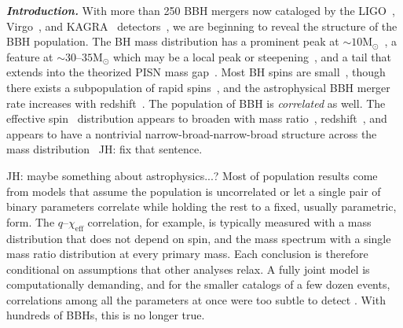 \documentclass[%
 reprint,
 amsmath,amssymb,
 aps,
 prl,
 nofootinbib,nobibnotes,
]{revtex4-2}
\newcommand{\Msun}{\ensuremath{\mathrm{M}_{\odot}}}
\newcommand{\chieff}{\ensuremath{\chi_{\mathrm{eff}}}}
\newcommand{\jh}[1]{{\color{orange}JH: #1}}
\newcommand{\heading}[1]{\textbf{\textit{#1}}}
\begin{document}
\heading{Introduction.}
With more than 250 \ac{BBH} mergers now cataloged by the LIGO~\cite{LIGOScientific:2014pky}, Virgo~\cite{VIRGO:2014yos}, and KAGRA~\cite{KAGRA:2020tym} detectors~\cite{LIGOScientific:2018mvr, LIGOScientific:2020ibl, LIGOScientific:2021usb, KAGRA:2021vkt, LIGOScientific:2025slb, LIGOScientific:2026wfs}, we are beginning to reveal the structure of the \ac{BBH} population. The \ac{BH} mass distribution has a prominent peak at $\sim 10\Msun$~\cite{LIGOScientific:2020kqk, Tiwari:2020otp, Edelman:2021zkw, KAGRA:2021duu, Callister:2023tgi, LIGOScientific:2025pvj, LIGOScientific:2026ctl}, a feature at $\sim 30$--$35 \Msun$ which may be a local peak or steepening~\cite{Talbot:2018cva, LIGOScientific:2020kqk, KAGRA:2021duu, Farah:2023vsc, LIGOScientific:2025pvj, LIGOScientific:2026ctl}, and a tail that extends into the theorized \ac{PISN} mass gap~\cite{Barkat:1967zz, Woosley:2016hmi, Tong:2025wpz, Antonini:2025ilj, Ray:2025xti}. Most \ac{BH} spins are small~\cite{Miller:2020zox, Roulet:2021hcu, Callister:2022qwb, Tong:2022iws, KAGRA:2021duu}, though there exists a subpopulation of rapid spins~\cite{Antonini:2024het, Plunkett:2026pxt, Li:2025iux, LIGOScientific:2026ctl}, and the astrophysical \ac{BBH} merger rate increases with redshift~\cite{Fishbach:2018edt, LIGOScientific:2020kqk, KAGRA:2021duu, LIGOScientific:2026ctl}. 
The population of \ac{BBH} is \textit{correlated} as well. The effective spin~\cite{Damour:2001, Racine:2008qv, Ajith:2009bn} distribution appears to broaden with mass ratio~\cite{Callister:2021fpo, Adamcewicz:2022hce, Heinzel:2023hlb, LIGOScientific:2026ctl}, redshift~\cite{Biscoveanu:2022qac, Heinzel:2023hlb}, and appears to have a nontrivial narrow-broad-narrow-broad structure across the mass distribution~\cite{Antonini:2025ilj, Tong:2025xir, Plunkett:2026pxt, Flanagan:2026ayy, Alvarez-Lopez:2026ymo} \jh{fix that sentence}. 

\jh{maybe something about astrophysics...?}
Most of population results come from models that assume the population is uncorrelated or let a single pair of binary parameters correlate while holding the rest to a fixed, usually parametric, form. The $q$--$\chieff$ correlation, for example, is typically measured with a mass distribution that does not depend on spin, and the mass spectrum with a single mass ratio distribution at every primary mass. Each conclusion is therefore conditional on assumptions that other analyses relax. A fully joint model is computationally demanding, and for the smaller catalogs of a few dozen events, correlations among all the parameters at once were too subtle to detect \citep[e.g., ][]{Biscoveanu:2022qac}. With hundreds of \acp{BBH}, this is no longer true.
\end{document}
